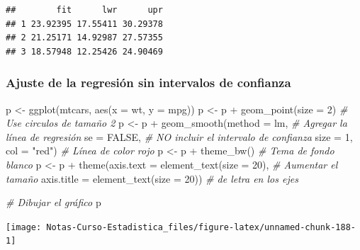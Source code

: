\documentclass[
  12pt,
]{book}
\newenvironment{Shaded}{\begin{snugshade}}{\end{snugshade}}
\newcommand{\AttributeTok}[1]{\textcolor[rgb]{0.77,0.63,0.00}{#1}}
\newcommand{\CommentTok}[1]{\textcolor[rgb]{0.56,0.35,0.01}{\textit{#1}}}
\newcommand{\ConstantTok}[1]{\textcolor[rgb]{0.00,0.00,0.00}{#1}}
\newcommand{\DecValTok}[1]{\textcolor[rgb]{0.00,0.00,0.81}{#1}}
\newcommand{\FunctionTok}[1]{\textcolor[rgb]{0.00,0.00,0.00}{#1}}
\newcommand{\NormalTok}[1]{#1}
\newcommand{\OtherTok}[1]{\textcolor[rgb]{0.56,0.35,0.01}{#1}}
\newcommand{\SpecialCharTok}[1]{\textcolor[rgb]{0.00,0.00,0.00}{#1}}
\newcommand{\StringTok}[1]{\textcolor[rgb]{0.31,0.60,0.02}{#1}}
\theoremstyle{definition}
\theoremstyle{definition}
\theoremstyle{definition}
\theoremstyle{remark}
\begin{document}
\begin{verbatim}
##        fit      lwr      upr
## 1 23.92395 17.55411 30.29378
## 2 21.25171 14.92987 27.57355
## 3 18.57948 12.25426 24.90469
\end{verbatim}

\hypertarget{ajuste-de-la-regresiuxf3n-sin-intervalos-de-confianza}{%
\subsubsection{Ajuste de la regresión sin intervalos de confianza}\label{ajuste-de-la-regresiuxf3n-sin-intervalos-de-confianza}}

\begin{Shaded}
\begin{Highlighting}[]
\NormalTok{p }\OtherTok{\textless{}{-}} \FunctionTok{ggplot}\NormalTok{(mtcars, }\FunctionTok{aes}\NormalTok{(}\AttributeTok{x =}\NormalTok{ wt, }\AttributeTok{y =}\NormalTok{ mpg)) }
\NormalTok{p }\OtherTok{\textless{}{-}}\NormalTok{ p }\SpecialCharTok{+} \FunctionTok{geom\_point}\NormalTok{(}\AttributeTok{size =} \DecValTok{2}\NormalTok{)       }\CommentTok{\# Use circulos de tamaño 2}
\NormalTok{p }\OtherTok{\textless{}{-}}\NormalTok{ p }\SpecialCharTok{+} \FunctionTok{geom\_smooth}\NormalTok{(}\AttributeTok{method =}\NormalTok{ lm,   }\CommentTok{\# Agregar la línea de regresión }
              \AttributeTok{se =} \ConstantTok{FALSE}\NormalTok{,           }\CommentTok{\# NO incluir el intervalo de confianza   }
              \AttributeTok{size =} \DecValTok{1}\NormalTok{,}
              \AttributeTok{col =} \StringTok{"red"}\NormalTok{)          }\CommentTok{\# Línea de color rojo }
\NormalTok{p }\OtherTok{\textless{}{-}}\NormalTok{ p }\SpecialCharTok{+} \FunctionTok{theme\_bw}\NormalTok{()                 }\CommentTok{\# Tema de fondo blanco}
\NormalTok{p }\OtherTok{\textless{}{-}}\NormalTok{ p }\SpecialCharTok{+} \FunctionTok{theme}\NormalTok{(}\AttributeTok{axis.text =} \FunctionTok{element\_text}\NormalTok{(}\AttributeTok{size =} \DecValTok{20}\NormalTok{),  }\CommentTok{\# Aumentar el tamaño }
               \AttributeTok{axis.title =} \FunctionTok{element\_text}\NormalTok{(}\AttributeTok{size =} \DecValTok{20}\NormalTok{)) }\CommentTok{\# de letra en los ejes}

\CommentTok{\# Dibujar el gráfico}
\NormalTok{p   }
\end{Highlighting}
\end{Shaded}

\begin{center}\texttt{[image: Notas-Curso-Estadistica\_files/figure-latex/unnamed-chunk-188-1]} \end{center}
\end{document}
